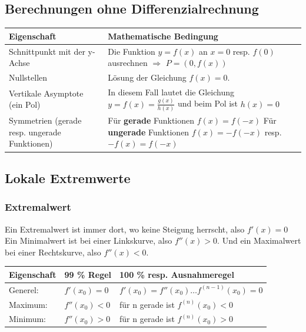 \documentclass[12pt]{scrartcl}
\begin{document}
\subsection{Berechnungen ohne Differenzialrechnung}
\begin{center}
    \begin{tabular}{| p{13em} | p{23em} | }
        \hline
        \rowcolor{Gray}
        \textbf{Eigenschaft}            & \textbf{Mathematische Bedingung} \\
        \hline
        Schnittpunkt mit der y-Achse    & Die Funktion $y=f(x)$ an $x=0$ resp. $f(0)$ ausrechnen $\Rightarrow$ $P=(0, f(x))$ \\
        \hline
        Nullstellen                     & Lösung der Gleichung $f(x)=0$. \\
        \hline
        Vertikale Asymptote (ein Pol)   & In diesem Fall lautet die Gleichung \newline $y = f(x) = \frac{g(x)}{h(x)}$ und beim Pol ist $h(x)=0$\\
        \hline
        Symmetrien (gerade resp. ungerade Funktionen) & Für \textbf{gerade} Funktionen $f(x) = f(-x)$ \newline Für \textbf{ungerade} Funktionen $f(x) = -f(-x)$ \newline \quad \quad \quad resp. $-f(x) = f(-x)$ \\
        \hline
    \end{tabular}
\end{center}

\subsection{Lokale Extremwerte}
\subsubsection{Extremalwert}
Ein Extremalwert ist immer dort, wo keine Steigung herrscht, also $f'(x) = 0$ \\
Ein Minimalwert ist bei einer Linkskurve, also $f''(x) > 0$. Und ein Maximalwert
bei einer Rechtskurve, also $f''(x) < 0$.

\begin{center}
    \begin{tabular}{|p{7em}|p{9em}|p{18em}|}
        \hline
        \rowcolor{Gray}
        \textbf{Eigenschaft} & \textbf{99 \% Regel} & \textbf{100 \% resp. Ausnahmeregel}\\
        \hline
        Generel: & $f'(x_0) = 0$ & $f'(x_0) = f''(x_0) \dots f^{(n - 1)}(x_0) = 0$\\
        \hline
        Maximum: & $f''(x_0) < 0$ & für n gerade ist $f^{(n)}(x_0) < 0$\\
        \hline
        Minimum: & $f''(x_0) > 0$ & für n gerade ist $f^{(n)}(x_0) > 0$\\
        \hline
    \end{tabular}
\end{center}
\end{document}
